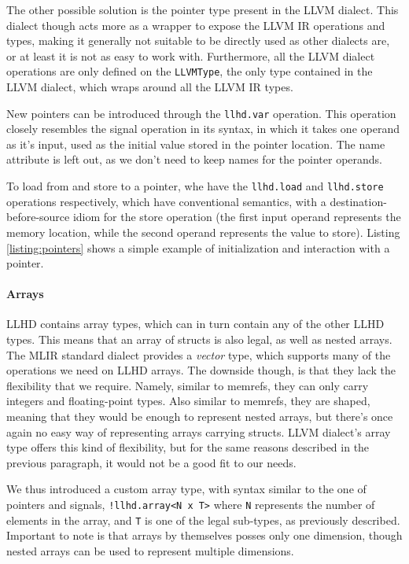 The other possible solution is the pointer type present in the LLVM dialect. This dialect though acts more as a wrapper to expose the LLVM IR operations and types, making it generally not suitable to be directly used as other dialects are, or at least it is not as easy to work with. Furthermore, all the LLVM dialect operations are only defined on the \texttt{LLVMType}, the only type contained in the LLVM dialect, which wraps around all the LLVM IR types.

New pointers can be introduced through the \texttt{llhd.var} operation. This operation closely resembles the signal operation in its syntax, in which it takes one operand as it's input, used as the initial value stored in the pointer location. The name attribute is left out, as we don't need to keep names for the pointer operands.

To load from and store to a pointer, whe have the \texttt{llhd.load} and \texttt{llhd.store} operations respectively, which have conventional semantics, with a destination-before-source idiom for the store operation (\ie the first input operand represents the memory location, while the second operand represents the value to store). Listing \ref{listing:pointers} shows a simple example of initialization and interaction with a pointer.


\paragraph{Arrays}
LLHD contains array types, which can in turn contain any of the other LLHD types. This means that an array of structs is also legal, as well as nested arrays. The MLIR standard dialect provides a \textit{vector} type, which supports many of the operations we need on LLHD arrays. The downside though, is that they lack the flexibility that we require. Namely, similar to memrefs, they can only carry integers and floating-point types. Also similar to memrefs, they are shaped, meaning that they would be enough to represent nested arrays, but there's once again no easy way of representing arrays carrying structs. LLVM dialect's array type offers this kind of flexibility, but for the same reasons described in the previous paragraph, it would not be a good fit to our needs.

We thus introduced a custom array type, with syntax similar to the one of pointers and signals, \ie \texttt{!llhd.array<N x T>} where  \texttt{N} represents the number of elements in the array, and \texttt{T} is one of the legal sub-types, as previously described. Important to note is that arrays by themselves posses only one dimension, though nested arrays can be used to represent multiple dimensions.

